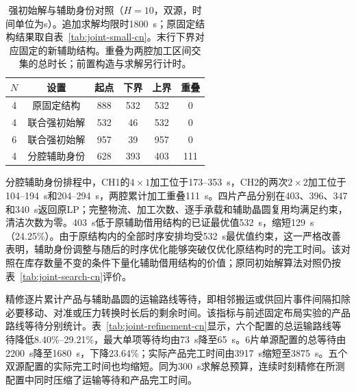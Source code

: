 \documentclass[final,5p,times,twocolumn]{elsarticle}
\begin{document}
\begin{table}[!t]
\centering\scriptsize\setlength{\tabcolsep}{2.5pt}
\caption{强初始解与辅助身份对照（$H=10$，双源，时间单位为s）。追加求解均限时1800~s；原固定结构结果取自表~\ref{tab:joint-small-cn}。末行下界对应固定的新辅助结构。重叠为两腔加工区间交集的总时长；前置构造与求解另行计时。}
\label{tab:joint-auxiliary-cn}
\begin{tabular}{cccccc}\toprule
$N$ & 设置 & 起点 & 下界 & 上界 & 重叠\\\midrule
4 & 原固定结构 & 888 & 532 & 532 & 0\\
4 & 联合强初始解 & 532 & 46 & 532 & 0\\
6 & 联合强初始解 & 957 & 39 & 957 & 0\\
4 & 分腔辅助身份 & 628 & 393 & 403 & 111\\
\bottomrule\end{tabular}\end{table}

分腔辅助身份排程中，CH1的$4\times1$加工位于173--353~s，CH2的两次$2\times2$加工位于104--194~s和204--294~s，两腔累计加工重叠111~s。四片产品分别在403、396、347和340~s返回原LP；完整物流、加工次数、逐手承载和辅助晶圆复用均满足约束，清洁次数为零。403~s低于原辅助借用结构的已证最优值532~s，缩短129~s（24.25\%）。由于原结构内的全部时序安排均受532~s最优值约束，这一严格改善表明，辅助身份调整与随后的时序优化能够突破仅优化原结构时的完工时间。该对照在库存数量不变的条件下量化辅助借用结构的价值；原同初始解算法对照仍按表~\ref{tab:joint-search-cn}评价。

精修逐片累计产品与辅助晶圆的运输路线等待，即相邻搬运或供回片事件间隔扣除必要移动、对准或压力转换时长后的剩余时间。该指标与前述固定布局实验的产品路线等待分别统计。表~\ref{tab:joint-refinement-cn}显示，六个配置的总运输路线等待降低8.40\%--29.21\%，最大单项等待均由73~s降至65~s。6片单源配置的总等待由2200~s降至1680~s，下降23.64\%；实际产品完工时间由3917~s缩短至3875~s。五个双源配置的实际完工时间也均缩短。同为300~s求解总预算，连续时刻精修在所测配置中同时压缩了运输等待和产品完工时间。
\end{document}
